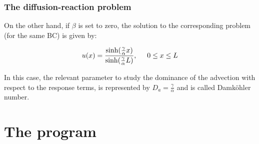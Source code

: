 \documentclass[11pt]{article}
\theoremstyle{theorem}
\theoremstyle{definition}
\begin{document}
\subsubsection{The diffusion-reaction problem}
On the other hand, if $\beta$ is set to zero, the solution to the corresponding problem (for the same BC) is given by:

\begin{equation}
	\label{eqn:DR-sol}
	u(x)=\frac{\sinh(\frac{\gamma}{\alpha}x)}{\sinh(\frac{\gamma}{\alpha}L)},\hspace{5mm} 0\le x\le L
\end{equation}

In this case, the relevant parameter to study the dominance of the advection with respect to the response terms, is represented by $D_a=\frac{\gamma}{\alpha}$ and is called Damk\"{o}hler number.\\

\section{The program}
\end{document}
